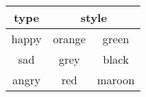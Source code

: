 \documentclass{article}
\begin{document}
\begin{tabular}{|c|c|c|}
\hline
\textbf{type} & \multicolumn{2}{c|}{\textbf{style}} \\
\hline
happy & orange & green \\
sad & grey & black \\
angry & red & maroon \\
\hline
\end{tabular}
\end{document}
